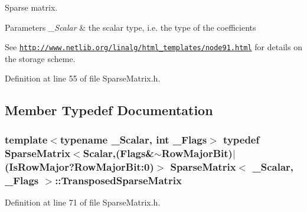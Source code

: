 Sparse matrix. 


\begin{DoxyParams}{Parameters}
{\em \-\_\-\-Scalar} & the scalar type, i.\-e. the type of the coefficients\\
\hline
\end{DoxyParams}
See \href{http://www.netlib.org/linalg/html_templates/node91.html}{\tt http\-://www.\-netlib.\-org/linalg/html\-\_\-templates/node91.\-html} for details on the storage scheme. 

Definition at line 55 of file Sparse\-Matrix.\-h.



\subsection{Member Typedef Documentation}
\hypertarget{class_sparse_matrix_a3e2968c1ff32087e31d8932fdff0f323}{
\subsubsection[{Transposed\-Sparse\-Matrix}]{\setlength{\rightskip}{0pt plus 5cm}template$<$typename \-\_\-\-Scalar, int \-\_\-\-Flags$>$ typedef {\bf Sparse\-Matrix}$<${\bf Scalar},({\bf Flags}\&$\sim${\bf Row\-Major\-Bit})$|$({\bf Is\-Row\-Major}?Row\-Major\-Bit\-:0)$>$ {\bf Sparse\-Matrix}$<$ \-\_\-\-Scalar, \-\_\-\-Flags $>$\-::{\bf Transposed\-Sparse\-Matrix}\hspace{0.3cm}{\ttfamily [protected]}}}\label{class_sparse_matrix_a3e2968c1ff32087e31d8932fdff0f323}


Definition at line 71 of file Sparse\-Matrix.\-h.



